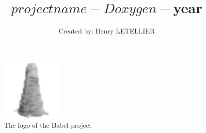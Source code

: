 
\usepackage{graphicx}

\title{$projectname - Doxygen - $year}
\author{Created by: Henry LETELLIER}
\date{} %

\begin{figure}[h]
    \centering
    \includegraphics[width=3cm]{./files/icon/favicon.png}
    \caption*{The logo of the Babel project}
\end{figure}
